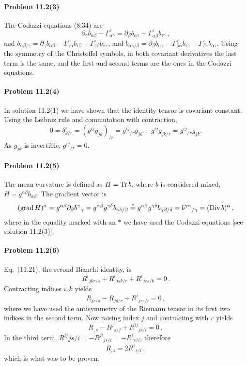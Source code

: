 \documentclass[a4paper,12pt]{article}
\def\Tr{\ensuremath{\mathop{\rm Tr}}}
\newcommand{\problem}[1]{\paragraph{Problem #1}}
\begin{document}

\problem{11.2(3)} The Codazzi equations (8.34) are
\[
 \partial_\gamma b_{\alpha\beta}-\Gamma^\tau_{\alpha\gamma}=\partial_\beta b_{\alpha\gamma}-\Gamma^\tau_{\alpha\beta}b_{\tau\gamma}\,,
\]
and $b_{\alpha\beta/\gamma} = \partial_\gamma b_{\alpha\beta} - \Gamma^\tau_{\gamma\alpha} b_{\tau\beta} - \Gamma^\tau_{\gamma\beta}b_{\alpha\tau}$, and $b_{\alpha\gamma/\beta} = \partial_\beta b_{\alpha\gamma} - \Gamma^\tau_{\beta\alpha} b_{\tau\gamma} - \Gamma^\tau_{\beta\gamma}b_{\alpha\tau}$. Using the symmetry of the Christoffel symbols, in both covariant derivatives the last term is the same, and the first and second terms are the ones in the Codazzi equations.


\problem{11.2(4)} In solution 11.2(1) we have shown that the identity tensor is covariant constant. Using the Leibniz rule and commutation with contraction,
\[
 0 = \delta^i_{k/r} = (g^{ij}g_{jk})_{/r} = g^{ij}{}_{/r}g_{jk} + g^{ij}g_{jk/r} = g^{ij}{}_{/r}g_{jk}.
\]
As $g_{jk}$ is invertible, $g^{ij}{}_{/r} = 0$.


\problem{11.2(5)} The mean curvature is defined as $H=\Tr b$, where $b$ is considered mixed, $H = g^{\alpha\beta}b_{\alpha\beta}$. The gradient vector is
\[
 (\mathop{\rm grad} H)^\alpha = g^{\alpha\beta}\partial_\beta b^\gamma{}_\gamma = g^{\alpha\beta}g^{\gamma\delta}b_{\gamma\delta/\beta}  \stackrel{*}{=}g^{\alpha\beta}g^{\gamma\delta}b_{\gamma\beta/\delta} = b^{\gamma\alpha}{}_{/\gamma} = (\mathop{\rm Div}b)^\alpha\,,
\]
where in the equality marked with an $*$ we have used the Codazzi equations [see solution 11.2(3)].


\problem{11.2(6)} Eq.\ (11.21), the second Bianchi identity, is
\[
 R^i{}_{jkr/s}+R^i{}_{jsk/r}+R^i{}_{jrs/k}=0\,.
\]
Contracting indices $i,k$ yields
\[
 R_{jr/s} - R_{js/r} + R^i{}_{jrs/i} = 0\,,
\]
where we have used the antisymmetry of the Riemann tensor in its first two indices in the second term.
Now raising index $j$ and contracting with $r$ yields
\[
 R_{,s} - R^j{}_{s/j} + R^{ij}{}_{js/i} = 0\,,
\]
In the third term, $R^{ij}{js/i} = -R^{ji}{}_{js/i} = -R^i{}_{s/i}$, therefore
\[
 R_{,s} = 2R^i{}_{s/i}\,,
\]
which is what was to be proven.
\end{document}
